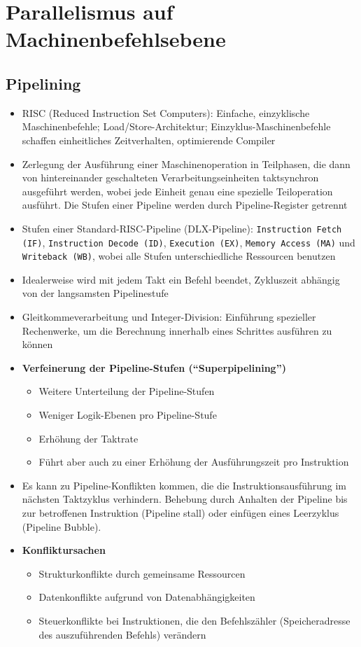 \chapter{Parallelismus auf Machinenbefehlsebene}

\section{Pipelining}
	\begin{itemize}
		\item RISC (Reduced Instruction Set Computers): Einfache, einzyklische Maschinenbefehle; Load/Store-Architektur; Einzyklus-Maschinenbefehle schaffen einheitliches Zeitverhalten, optimierende Compiler
		\item Zerlegung der Ausführung einer Maschinenoperation in Teilphasen, die dann von hintereinander geschalteten Verarbeitungseinheiten taktsynchron ausgeführt werden, wobei jede Einheit genau eine spezielle Teiloperation ausführt. Die Stufen einer Pipeline werden durch Pipeline-Register getrennt
		\item Stufen einer Standard-RISC-Pipeline (DLX-Pipeline): \texttt{Instruction Fetch (IF)}, \texttt{Instruction Decode (ID)}, \texttt{Execution (EX)}, \texttt{Memory Access (MA)} und \texttt{Writeback (WB)}, wobei alle Stufen unterschiedliche Ressourcen benutzen
		\item Idealerweise wird mit jedem Takt ein Befehl beendet, Zykluszeit abhängig von der langsamsten Pipelinestufe
		\item Gleitkommeverarbeitung und Integer-Division: Einführung spezieller Rechenwerke, um die Berechnung innerhalb eines Schrittes ausführen zu können
		\item \textbf{Verfeinerung der Pipeline-Stufen ("`Superpipelining"')}
		\begin{itemize}
			\item Weitere Unterteilung der Pipeline-Stufen
			\item Weniger Logik-Ebenen pro Pipeline-Stufe 
			\item Erhöhung der Taktrate
			\item Führt aber auch zu einer Erhöhung der Ausführungszeit pro Instruktion
		\end{itemize}
		\item Es kann zu Pipeline-Konflikten kommen, die die Instruktionsausführung im nächsten Taktzyklus verhindern. Behebung durch Anhalten der Pipeline bis zur betroffenen Instruktion (Pipeline stall) oder einfügen eines Leerzyklus (Pipeline Bubble). 
		\item \textbf{Konfliktursachen}
		\begin{itemize}
			\item Strukturkonflikte durch gemeinsame Ressourcen
			\item Datenkonflikte aufgrund von Datenabhängigkeiten
			\item Steuerkonflikte bei Instruktionen, die den Befehlszähler (Speicheradresse des auszuführenden Befehls) verändern
		\end{itemize}
	\end{itemize}

